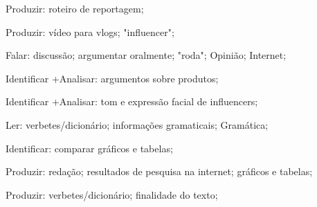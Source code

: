  Produzir: roteiro de reportagem;

 Produzir: vídeo para vlogs; "influencer"; 

 Falar: discussão; argumentar oralmente; "roda"; Opinião; Internet; 

 Identificar +Analisar: argumentos sobre produtos;

 Identificar +Analisar: tom e expressão facial de influencers;

 Ler: verbetes/dicionário; informações gramaticais; Gramática; 

 Identificar: comparar gráficos e tabelas;

 Produzir: redação; resultados de pesquisa na internet; gráficos e tabelas;

 Produzir: verbetes/dicionário; finalidade do texto;


